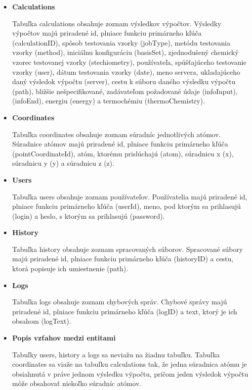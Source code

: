 \documentclass[12pt,a4paper]{article}
\begin{document}
\begin{itemize}
	\item{\bf Calculations} \par
	Tabuľka calculations obsahuje zoznam výsledkov výpočtov. Výsledky výpočtov majú priradené id, plniace funkciu primárneho kľúča (calculationID), spôsob testovania vzorky (jobType), metódu testovania vzorky (method), iniciálnu konfiguráciu (basisSet), zjednodušený chemický vzorec testovanej vzorky (stechiometry), používateľa, spúšťajúceho testovanie vzorky (user), dátum testovania vzorky (date), meno servera, ukladajúceho daný výsledok výpočtu (server), cestu k súboru daného výsledku výpočtu (path), bližšie nešpecifikované, zadávateľom požadované údaje (infoInput), (infoEnd), energiu (energy) a termochémiu (thermoChemistry).
	\item{\bf Coordinates} \par
	Tabuľka coordinates obsahuje zoznam súradníc jednotlivých atómov. Súradnice atómov majú priradené id, plniace funkciu primárneho kľúča (pointCoordinateId), atóm, ktorému prislúchajú (atom), súradnicu x (x), súradnicu y (y) a súradnicu z (z).
	\item{\bf Users} \par
	Tabuľka users obsahuje zoznam používateľov. Používatelia majú priradené id, plniace funkciu primárneho kľúča (userId), meno, pod ktorým sa prihlasujú (login) a heslo, s ktorým sa prihlasujú (password).
	
\pagebreak
	
	\item{\bf History} \par
	Tabuľka history obsahuje zoznam spracovaných súborov. Spracované súbory majú priradené id, plniace funkciu primárneho kľúča (historyID) a cestu, ktorá popisuje ich umiestnenie (path).
	\item{\bf Logs} \par
	Tabuľka logs obsahuje zoznam chybových správ. Chybové správy majú priradené id, plniace funkciu primárneho kľúča (logID) a text, ktorý je ich obsahom (logText).
	\item{\bf Popis vzťahov medzi entitami} \par
	Tabuľky users, history a logs sa neviažu na žiadnu tabuľku. Tabuľka coordinates sa viaže na tabuľku calculations tak, že jedna súradnica atómu je obsiahnutá v práve jednom výsledku výpočtu, pričom jeden výsledok výpočtu môže obsahovať niekoľko súradníc atómov.
\end{itemize}

\pagebreak
\end{document}
